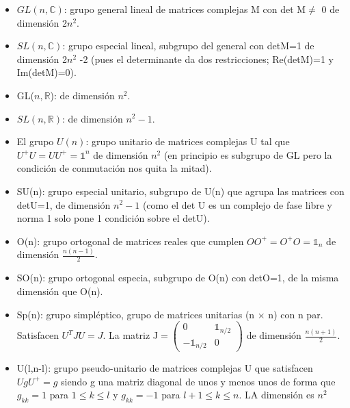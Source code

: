 \documentclass{article}
\begin{document}
    \begin{itemize}
        \item    $GL(n,\mathds{C})$: grupo general lineal de matrices complejas M con det M$\neq$ 0 de dimensión 2$n^2$.
        
        \item $SL(n, \mathds{C})$: grupo especial lineal, subgrupo del general con detM=1 de dimensión 2$n^2$ -2 (pues el determinante da dos restricciones; Re(detM)=1 y Im(detM)=0).
        
        \item GL($n,\mathds{R}$): de dimensión $n^2$.
        
        \item $SL(n,\mathds{R})$: de dimensión $n^2-1$.
        
        \item El grupo $U(n)$: grupo unitario de matrices complejas U tal que $U^+U=UU^+=\mathds{1}^n$ de dimensión $n^2$ (en principio es subgrupo de GL pero la condición de conmutación nos quita la mitad).
        
        \item SU(n): grupo especial unitario, subgrupo de U(n) que agrupa las matrices con detU=1, de dimensión $n^2-1$ (como el det U es un complejo de fase libre y norma 1 solo pone 1 condición sobre el detU).
        
        \item O(n): grupo ortogonal de matrices reales que cumplen $OO^+=O^+O=\mathds{1}_n$ de dimensión $\frac{n(n-1)}{2}$.
        
        \item SO(n): grupo ortogonal especia, subgrupo de O(n) con detO=1, de la misma dimensión que O(n).
        
        \item Sp(n): grupo simpléptico, grupo de matrices unitarias (n $\times$ n) con n par. Satisfacen $U^T J U=J$. La matriz J$=\left (\begin{array}{cc}
            0 & \mathds{1}_{n/2} \\
            -\mathds{1}_{n/2} & 0
        \end{array} \right )$ de dimensión $\frac{n(n+1)}{2}$.
        
        \item U(l,n-l): grupo pseudo-unitario de matrices complejas U que satisfacen $UgU^+=g$ siendo g una matriz diagonal de unos y menos unos de forma que $g_{kk}=1$ para $1 \leq k \leq l$ y $g_{kk}=-1$ para $ l+1 \leq k \leq n$. LA dimensión es $n^{2}$
        

\end{itemize}
\end{document}
